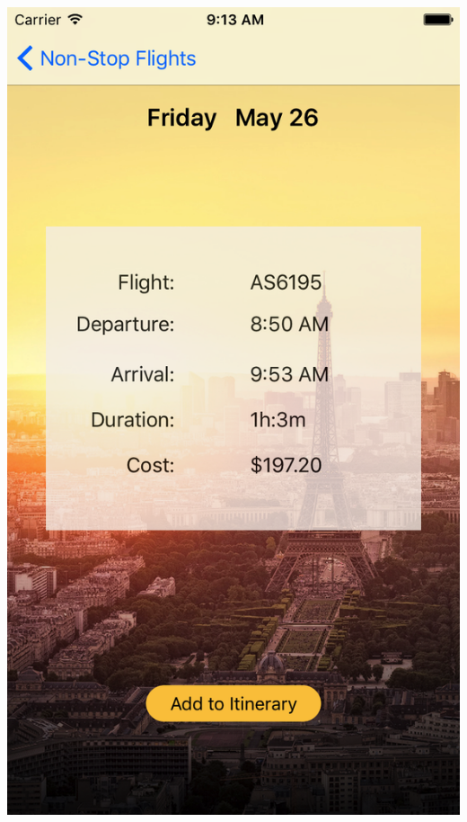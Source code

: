 \documentclass{beamer}
\begin{document}
\begin{frame}
\begin{columns}
\begin{column}{0.3\textwidth}
        \begin{center} 
            \includegraphics[scale=0.14]{flightsDetail}
        \end{center}
    \end{column}
\end{columns}
\end{frame}
\end{document}
